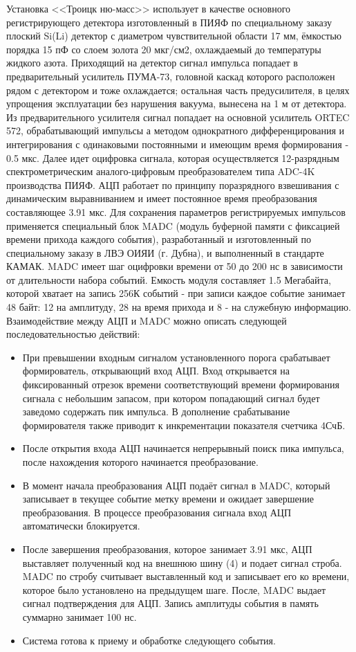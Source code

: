 \documentclass[a4paper,14pt]{extreport}
\begin{document}
Установка <<Троицк ню-масс>> использует в качестве основного регистрирующего детектора изготовленный в ПИЯФ по специальному заказу плоский Si(Li) детектор с диаметром чувствительной области 17 мм, ёмкостью порядка 15 пФ со слоем золота 20 мкг/см2, охлаждаемый до температуры жидкого азота. Приходящий на детектор сигнал импульса попадает в предварительный усилитель ПУМА-73, головной каскад которого расположен рядом с детектором и тоже охлаждается; остальная часть предусилителя, в целях упрощения эксплуатации без нарушения вакуума, вынесена на 1 м от детектора. Из предварительного усилителя сигнал попадает на основной усилитель ORTEC 572, обрабатывающий импульсы а методом однократного дифференцирования и интегрирования с одинаковыми постоянными и имеющим время формирования - 0.5 мкс. Далее идет оцифровка сигнала, которая осуществляется 12-разрядным спектрометрическим аналого-цифровым преобразователем типа ADC-4K производства ПИЯФ. АЦП работает по принципу поразрядного взвешивания с динамическим выравниванием и имеет постоянное время преобразования составляющее 3.91 мкс. Для сохранения параметров регистрируемых импульсов применяется специальный блок MADC (модуль буферной памяти с фиксацией времени прихода каждого события), разработанный и изготовленный по специальному заказу в ЛВЭ ОИЯИ (г. Дубна), и выполненный в стандарте КАМАК. MADC имеет шаг оцифровки времени от 50 до 200 нс в зависимости от длительности набора событий. Емкость модуля составляет 1.5 Мегабайта, которой хватает на запись 256К событий - при записи каждое событие занимает 48 байт: 12 на амплитуду, 28 на время прихода и 8 - на служебную информацию.
Взаимодействие между АЦП и MADC можно описать следующей последовательностью действий:
\begin{itemize}
    \item При превышении входным сигналом установленного порога срабатывает     формирователь, открывающий вход АЦП. Вход открывается на фиксированный отрезок времени соответствующий времени  формирования сигнала с небольшим запасом, при котором попадающий сигнал будет заведомо содержать пик импульса. В дополнение срабатывание формирователя также приводит к инкрементации показателя счетчика  4СчБ.
    \item После открытия входа АЦП начинается непрерывный поиск пика импульса, после нахождения которого начинается преобразование.
    \item В момент начала преобразования АЦП подаёт сигнал в MADC, который записывает в текущее событие метку времени и ожидает завершение преобразования. В процессе преобразования сигнала вход АЦП автоматически блокируется.
    \item После завершения преобразования, которое занимает 3.91 мкс, АЦП выставляет полученный код на внешнюю шину (4) и подает сигнал строба. MADC по стробу считывает выставленный код и записывает его ко времени, которое было установлено на предыдущем шаге. После, MADC выдает сигнал подтверждения для АЦП. Запись амплитуды события в память суммарно занимает 100 нс.
    \item Система готова к приему и обработке следующего события.
\end{itemize}
\end{document}
